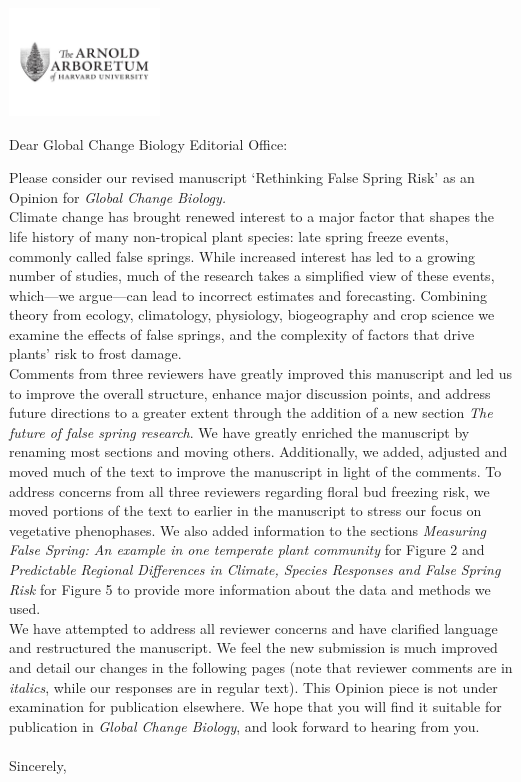 \documentclass[11pt,a4paper]{letter}\usepackage[]{graphicx}\usepackage[]{color}
\begin{document}
\begin{letter}{}
\includegraphics[width=0.3\textwidth]{AA_logo.jpg}

\opening{Dear Global Change Biology Editorial Office:}

\noindent Please consider our revised manuscript `Rethinking False Spring Risk' as an Opinion for \emph{Global Change Biology.} 
\vspace{1.5ex}\\
Climate change has brought renewed interest to a major factor that shapes the life history of many non-tropical plant species: late spring freeze events, commonly called false springs. While increased interest has led to a growing number of studies, much of the research takes a simplified view of these events, which---we argue---can lead to incorrect estimates and forecasting. Combining theory from ecology, climatology, physiology, biogeography and crop science we examine the effects of false springs, and the complexity of factors that drive plants' risk to frost damage.
\vspace{1.5ex}\\
Comments from three reviewers have greatly improved this manuscript and led us to improve the overall structure, enhance major discussion points, and address future directions to a greater extent through the addition of a new section \textit{The future of false spring research}. We have greatly enriched the manuscript by renaming most sections and moving others. Additionally, we added, adjusted and moved much of the text to improve the manuscript in light of the comments. To address concerns from all three reviewers regarding floral bud freezing risk, we moved portions of the text to earlier in the manuscript to stress our focus on vegetative phenophases. We also added information to the sections \emph{Measuring False Spring: An example in one temperate plant community} for Figure 2 and \emph{Predictable Regional Differences in Climate, Species Responses and False Spring Risk} for Figure 5 to provide more information about the data and methods we used.
\vspace{1.5ex}\\
We have attempted to address all reviewer concerns and have clarified language and restructured the manuscript. We feel the new submission is much improved and detail our changes in the following pages (note that reviewer comments are in \emph{italics}, while our responses are in regular text). This Opinion piece is not under examination for publication elsewhere. We hope that you will find it suitable for publication in \emph{Global Change Biology}, and look forward to hearing from you.
\\\vspace{-1ex}\\
\noindent Sincerely,\\


\end{letter}
\end{document}
